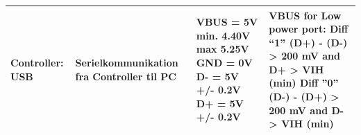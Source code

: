 \begin{table}[h]
\begin{tabularx}{\textwidth}{|l|X|X|X|}
Controller: USB
	& Serielkommunikation fra Controller til PC 
	& VBUS = 5V min. 4.40V max 5.25V \newline
		GND = 0V \newline
		D- = 5V +/- 0.2V \newline
		D+ = 5V +/- 0.2V \newline
	& VBUS for Low power port: \newline
		Diff  “1” \newline
		(D+) - (D-) > 200 mV \newline
		and D+ > VIH (min) \newline
		Diff ”0” \newline
		(D-) - (D+) > 200 mV \newline
		and D- > VIH (min) \newline
	\\ \hline
	
	\end{tabularx}
\end{table}